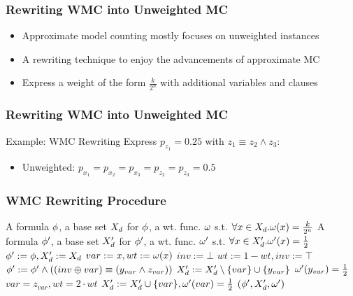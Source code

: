 \begin{frame}
  \frametitle{Rewriting WMC into Unweighted MC}
  \begin{itemize}
    \item Approximate model counting mostly focuses on unweighted instances
          \pause
    \item A rewriting technique to enjoy the advancements of approximate MC
          \pause
    \item Express a weight of the form $\frac{k}{2^n}$ with additional variables and clauses
  \end{itemize}
\end{frame}

\begin{frame}
  \frametitle{Rewriting WMC into Unweighted MC}
  \begin{block}{Example: WMC Rewriting}
    Express $p_{z_1}=0.25$ with $z_1\equiv z_2\land z_3$:
    \begin{figure}
      \centering
      
    \end{figure}
    \begin{itemize}
      \item Unweighted: $p_{x_1}=p_{x_2}=p_{x_3}=p_{z_2}=p_{z_3}=0.5$
    \end{itemize}
  \end{block}
\end{frame}

\begin{frame}
  \frametitle{WMC Rewriting Procedure}
  {
    \scriptsize
    \begin{algorithmic}[1]
      \REQUIRE A formula $\phi$, a base set $X_d$ for $\phi$,
      a wt. func. $\omega$ s.t. $\forall x\in X_d.\omega(x)=\frac{k}{2^n}$
      \ENSURE A formula $\phi'$, a base set $X_d'$ for $\phi'$,
      a wt. func. $\omega'$ s.t. $\forall x\in X_d'.\omega'(x)=\frac{1}{2}$
      \STATE $\phi':=\phi,X_d':=X_d$
      \STATE $var:=x,wt:=\omega(x)$
      \STATE $inv:=\bot$
      \STATE $wt:=1-wt,inv:=\top$
      \ENDIF
      \STATE $\phi':=\phi'\land((inv \oplus var) \equiv (y_{var} \land z_{var}))$
      \STATE $X_d':=X_d'\setminus\{var\}\cup\{y_{var}\}$
      \STATE $\omega'(y_{var})=\frac{1}{2}$
      \STATE $var=z_{var},wt=2 \cdot wt$
      \ENDWHILE
      \STATE $X_d':=X_d'\cup\{var\},\omega'(var)=\frac{1}{2}$
      \ENDFOR
      \RETURN $(\phi',X_d',\omega')$
    \end{algorithmic}
  }
\end{frame}